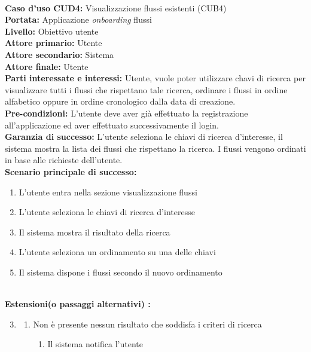 \ \\
\textbf{Caso d’uso CUD4:} Visualizzazione flussi esistenti (CUB4) \\
\textbf{Portata:} Applicazione \textit{onboarding} flussi\\
\textbf{Livello:} Obiettivo utente \\
\textbf{Attore primario:} Utente \\
\textbf{Attore secondario:} Sistema \\
\textbf{Attore finale:} Utente \\
\textbf{Parti interessate e interessi:} 
Utente, vuole poter utilizzare chavi di ricerca per visualizzare tutti i flussi che rispettano tale ricerca, ordinare i flussi in ordine alfabetico oppure in ordine cronologico dalla data di creazione. \\
\textbf{Pre-condizioni:} L’utente deve aver già effettuato la registrazione all’applicazione ed aver effettuato successivamente il login.\\
\textbf{Garanzia di successo:} L'utente seleziona le chiavi di ricerca d'interesse, il sistema mostra la lista dei flussi che rispettano la ricerca. I flussi vengono ordinati in base alle richieste dell'utente. \\
\textbf{Scenario principale di successo:} 
\begin{enumerate}
  \item L’utente entra nella sezione visualizzazione flussi
  \item L'utente seleziona le chiavi di ricerca d'interesse
  \item Il sistema mostra il risultato della ricerca
  \item L'utente seleziona un ordinamento su una delle chiavi
  \item Il sistema dispone i flussi secondo il nuovo ordinamento
\end{enumerate} 
\  \\
\textbf{Estensioni(o passaggi alternativi) :}
\begin{enumerate}
\setcounter{enumi}{2}
 \item
     \begin{enumerate}
     \item Non è presente nessun risultato che soddisfa i criteri di ricerca
     \begin{enumerate}
            \item Il sistema notifica l’utente
        \end{enumerate}
    \end{enumerate}
 \end{enumerate} 

